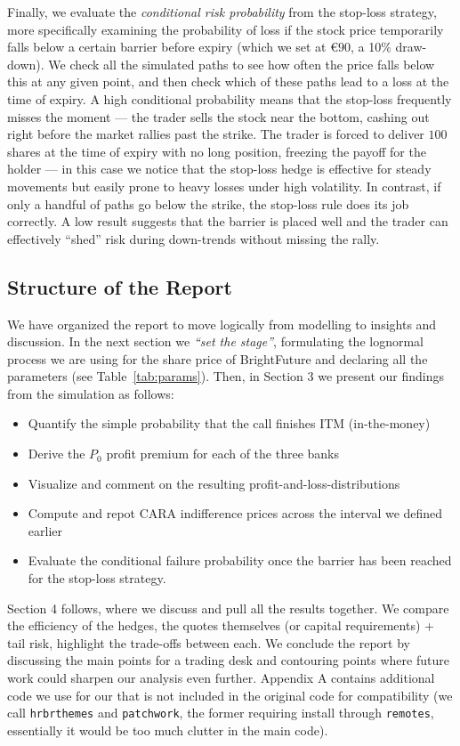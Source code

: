 \documentclass[11pt,a4paper]{article}
\begin{document}
Finally, we evaluate the \textit{conditional risk probability} from the stop-loss strategy, more specifically examining the probability of loss if the stock price temporarily falls below a certain barrier before expiry (which we set at \(\euro90\), a 10\% draw-down). We check all the simulated paths to see how often the price falls below this at any given point, and then check which of these paths lead to a loss at the time of expiry. A high conditional probability means that the stop-loss frequently misses the moment --- the trader sells the stock near the bottom, cashing out right before the market rallies past the strike. The trader is forced to deliver \(100\) shares at the time of expiry with no long position, freezing the payoff for the holder --- in this case we notice that the stop-loss hedge is effective for steady movements but easily prone to heavy losses under high volatility. In contrast, if only a handful of paths go below the strike, the stop-loss rule does its job correctly. A low result suggests that the barrier is placed well and the trader can effectively ``shed'' risk during down-trends without missing the rally.
	
	\subsection{Structure of the Report}
	
	We have organized the report to move logically from modelling to insights and discussion. In the next section we \textit{``set the stage''}, formulating the lognormal process we are using for the share price of BrightFuture and declaring all the parameters (see Table~\ref{tab:params}). Then, in Section 3 we present our findings from the simulation as follows:
	\begin{itemize}
		\item Quantify the simple probability that the call finishes ITM (in-the-money)
		\item Derive the \( P_0 \) profit premium for each of the three banks
		\item Visualize and comment on the resulting profit-and-loss-distributions
		\item Compute and repot CARA indifference prices across the interval we defined earlier
		\item Evaluate the conditional failure probability once the barrier has been reached for the stop-loss strategy.
	\end{itemize}
	
	Section 4 follows, where we discuss and pull all the results together. We compare the efficiency of the hedges, the quotes themselves (or capital requirements) + tail risk, highlight the trade-offs between each. We conclude the report by discussing the main points for a trading desk and contouring points where future work could sharpen our analysis even further. Appendix A contains additional code we use for our that is not included in the original code for compatibility (we call \texttt{hrbrthemes} and \texttt{patchwork}, the former requiring install through \texttt{remotes}, essentially it would be too much clutter in the main code).
	
\end{document}
